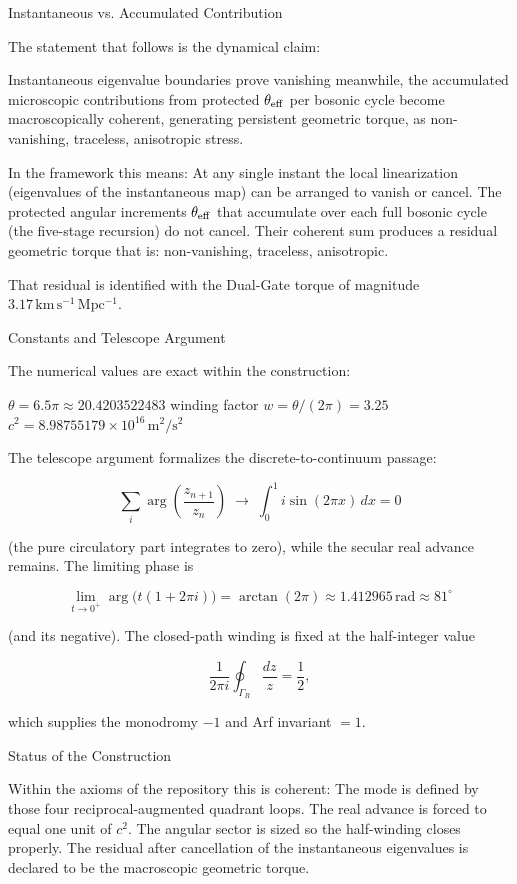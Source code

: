 Instantaneous vs. Accumulated Contribution

The statement that follows is the dynamical claim:

Instantaneous eigenvalue boundaries prove vanishing meanwhile, the accumulated microscopic contributions from protected \(\theta_{\rm eff}\) per bosonic cycle become macroscopically coherent, generating persistent geometric torque, as non-vanishing, traceless, anisotropic stress.

In the framework this means:
At any single instant the local linearization (eigenvalues of the instantaneous map) can be arranged to vanish or cancel.
The protected angular increments \(\theta_{\rm eff}\) that accumulate over each full bosonic cycle (the five-stage recursion) do not cancel. Their coherent sum produces a residual geometric torque that is:
  non-vanishing,
  traceless,
  anisotropic.

That residual is identified with the Dual-Gate torque of magnitude \(3.17\,\mathrm{km\,s^{-1}\,Mpc^{-1}}\).

Constants and Telescope Argument

The numerical values are exact within the construction:

\(\theta = 6.5\pi \approx 20.4203522483\)
winding factor \(w = \theta/(2\pi) = 3.25\)
\(c^2 = 8.98755179\times 10^{16}\,\mathrm{m}^2/\mathrm{s}^2\)

The telescope argument formalizes the discrete-to-continuum passage:

\[
\sum_i \arg\left(\frac{z_{n+1}}{z_n}\right)
\;\longrightarrow\;
\int_0^1 i\sin(2\pi x)\,dx = 0
\]

(the pure circulatory part integrates to zero), while the secular real advance remains. The limiting phase is

\[
\lim_{t\to 0^+} \arg\bigl(t(1+2\pi i)\bigr) = \arctan(2\pi) \approx 1.412965\,\mathrm{rad}\approx 81^\circ
\]

(and its negative). The closed-path winding is fixed at the half-integer value

\[
\frac{1}{2\pi i}\oint_{\Gamma_R}\frac{dz}{z} = \frac12,
\]

which supplies the monodromy \(-1\) and Arf invariant \(=1\).

Status of the Construction

Within the axioms of the repository this is coherent:
The mode is defined by those four reciprocal-augmented quadrant loops.
The real advance is forced to equal one unit of \(c^2\).
The angular sector is sized so the half-winding closes properly.
The residual after cancellation of the instantaneous eigenvalues is declared to be the macroscopic geometric torque.

